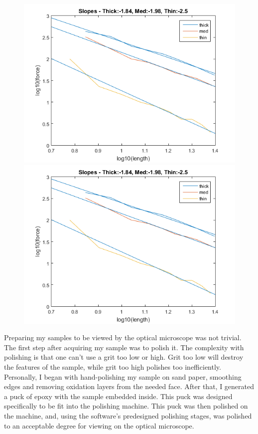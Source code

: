 \documentclass{article}
\begin{document}
\begin{figure}[h]
	\begin{minipage}{.5\textwidth}
		\centering
		\includegraphics[scale=.3]{Lab1f1.png}
	\end{minipage}		
	\begin{minipage}{.5\textwidth}
		\centering
		\includegraphics[scale=.3]{Lab1f1.png}
	\end{minipage}
\end{figure}

Preparing my samples to be viewed by the optical microscope was not trivial. The first step after acquiring my sample was to polish it. The complexity with polishing is that one can't use a grit too low or high. Grit too low will destroy the features of the sample, while grit too high polishes too inefficiently. Personally, I began with hand-polishing my sample on sand paper, smoothing edges and removing oxidation layers from the needed face. After that, I generated a puck of epoxy with the sample embedded inside. This puck was designed specifically to be fit into the polishing machine. This puck was then polished on the machine, and, using the software's predesigned polishing stages, was polished to an acceptable degree for viewing on the optical microscope.
\end{document}
